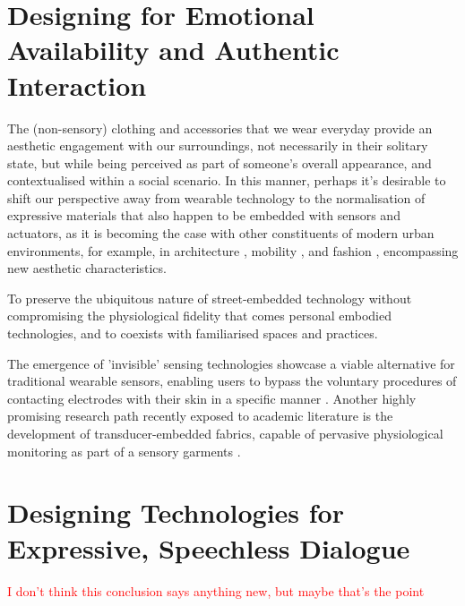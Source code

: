 
\section{Designing for Emotional Availability and Authentic Interaction}

The (non-sensory) clothing and accessories that we wear everyday provide an aesthetic engagement with our surroundings, not necessarily in their solitary state, but while being perceived as part of someone's overall appearance, and contextualised within a social scenario. In this manner, perhaps it's desirable to shift our perspective away from wearable technology to the normalisation of expressive materials that also happen to be embedded with sensors and actuators, as it is becoming the case with other constituents of modern urban environments, for example, in architecture \cite{alvarez_re-imagining_2017}, mobility \cite{nesmachnow_bus_2020}, and fashion \cite{noauthor_collaboration_2022}, encompassing new aesthetic characteristics.

To preserve the ubiquitous nature of street-embedded technology without compromising the physiological fidelity that comes personal embodied technologies, and to coexists with familiarised spaces and practices.

The emergence of 'invisible' sensing technologies showcase a viable alternative for traditional wearable sensors, enabling users to bypass the voluntary procedures of contacting electrodes with their skin in a specific manner \cite{dos_santos_silva_design_2021}. Another highly promising research path recently exposed to academic literature is the development of transducer-embedded fabrics, capable of pervasive physiological monitoring as part of a sensory garments \cite{yan_single_2022}. 

\section{Designing Technologies for Expressive, Speechless Dialogue}
\textcolor{red}{I don't think this conclusion says anything new, but maybe that's the point}

